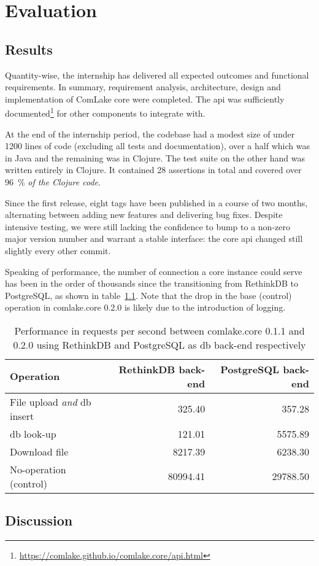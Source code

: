 \chapter{Evaluation}

\section{Results}
Quantity-wise, the internship has delivered
all expected outcomes and functional requirements.  In summary,
requirement analysis, architecture, design and implementation
of ComLake core were completed.  The \gls{api} was sufficiently
documented\footnote{\url{https://comlake.github.io/comlake.core/api.html}}
for other components to integrate with.

At the end of the internship period, the codebase had a modest size of under
1200 lines of code (excluding all tests and documentation), over a half which
was in Java and the remaining was in Clojure.  The test suite on the other hand
was written entirely in Clojure.  It contained 28 assertions in total
and covered over \SI{96}{\percent} \emph{of the Clojure code}.

Since the first release, eight tags have been published in a course
of two months, alternating between adding new features and delivering
bug fixes.  Despite intensive testing, we were still lacking the confidence
to bump to a non-zero major version number and warrant a stable interface:
the core \gls{api} changed still slightly every other commit.

Speaking of performance, the number of connection a core instance could serve
has been in the order of thousands since the transitioning from RethinkDB
to PostgreSQL, as shown in table~\ref{rdbpsql}.  Note that the drop in
the base (control) operation in comlake.core 0.2.0 is likely due to
the introduction of logging.
\begin{table}\centering
  \caption{Performance in requests per second between comlake.core 0.1.1
  and 0.2.0 using RethinkDB and PostgreSQL as \gls{db} back-end respectively}
  \begin{tabular}{l r r}
    \toprule
    Operation & RethinkDB back-end & PostgreSQL back-end\\
    \midrule
    File upload \emph{and} \gls{db} insert & 325.40 & 357.28\\
    \gls{db} look-up & 121.01 & 5575.89\\
    Download file & 8217.39 & 6238.30\\
    No-operation (control) & 80994.41 & 29788.50\\
    \bottomrule
  \end{tabular}
  \label{rdbpsql}
\end{table}

\section{Discussion}
